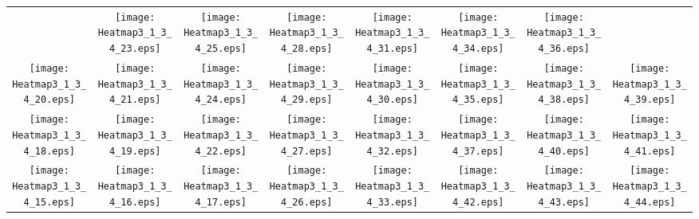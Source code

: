 \documentclass{standalone}
\begin{document}
\renewcommand{\arraystretch}{0}
\setlength{\tabcolsep}{0pt}
\begin{tabular}{ *8{c} }
 & \texttt{[image: Heatmap3\_1\_3\_4\_23.eps]} & \texttt{[image: Heatmap3\_1\_3\_4\_25.eps]} & \texttt{[image: Heatmap3\_1\_3\_4\_28.eps]} & \texttt{[image: Heatmap3\_1\_3\_4\_31.eps]} & \texttt{[image: Heatmap3\_1\_3\_4\_34.eps]} & \texttt{[image: Heatmap3\_1\_3\_4\_36.eps]} &  \\
\texttt{[image: Heatmap3\_1\_3\_4\_20.eps]} & \texttt{[image: Heatmap3\_1\_3\_4\_21.eps]} & \texttt{[image: Heatmap3\_1\_3\_4\_24.eps]} & \texttt{[image: Heatmap3\_1\_3\_4\_29.eps]} & \texttt{[image: Heatmap3\_1\_3\_4\_30.eps]} & \texttt{[image: Heatmap3\_1\_3\_4\_35.eps]} & \texttt{[image: Heatmap3\_1\_3\_4\_38.eps]} & \texttt{[image: Heatmap3\_1\_3\_4\_39.eps]} \\
\texttt{[image: Heatmap3\_1\_3\_4\_18.eps]} & \texttt{[image: Heatmap3\_1\_3\_4\_19.eps]} & \texttt{[image: Heatmap3\_1\_3\_4\_22.eps]} & \texttt{[image: Heatmap3\_1\_3\_4\_27.eps]} & \texttt{[image: Heatmap3\_1\_3\_4\_32.eps]} & \texttt{[image: Heatmap3\_1\_3\_4\_37.eps]} & \texttt{[image: Heatmap3\_1\_3\_4\_40.eps]} & \texttt{[image: Heatmap3\_1\_3\_4\_41.eps]} \\
\texttt{[image: Heatmap3\_1\_3\_4\_15.eps]} & \texttt{[image: Heatmap3\_1\_3\_4\_16.eps]} & \texttt{[image: Heatmap3\_1\_3\_4\_17.eps]} & \texttt{[image: Heatmap3\_1\_3\_4\_26.eps]} & \texttt{[image: Heatmap3\_1\_3\_4\_33.eps]} & \texttt{[image: Heatmap3\_1\_3\_4\_42.eps]} & \texttt{[image: Heatmap3\_1\_3\_4\_43.eps]} & \texttt{[image: Heatmap3\_1\_3\_4\_44.eps]} \\

\end{tabular}
\end{document}
